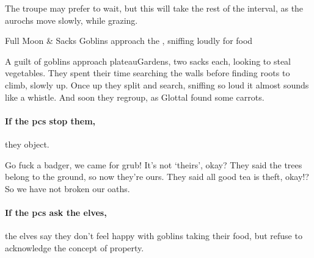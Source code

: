 The troupe may prefer to wait, but this will take the rest of the \gls{interval}, as the aurochs move slowly, while grazing.

{Full Moon \& Sacks}%
{Goblins approach the , sniffing loudly for food}%

A guilt of goblins approach \gls{plateauGardens}, two sacks each, looking to steal vegetables.
They spent their time searching the walls before finding roots to climb, slowly up.
Once up they split and search, sniffing so loud it almost sounds like a whistle.
And soon they regroup, as Glottal found some carrots.

\paragraph{If the \glspl{pc} stop them,}
they object.

\begin{speechtext}
  Go fuck a badger, we came for grub!
  It's not `theirs', okay?
  They said the trees belong to the ground, so now they're ours.
  They said all good tea is theft, okay!?
  So we have not broken our oaths.
\end{speechtext}



\paragraph{If the \glspl{pc} ask the elves,}
the elves say they don't feel happy with goblins taking their food, but refuse to acknowledge the concept of property.

